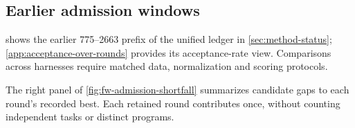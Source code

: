 \subsection{Earlier admission windows}\label{app:record-windows}

 shows the earlier 775--2663 prefix of the unified
ledger in \cref{sec:method-status}; \cref{app:acceptance-over-rounds}
provides its acceptance-rate view. Comparisons across harnesses require
matched data, normalization and scoring protocols.

The right panel of \cref{fig:fw-admission-shortfall} summarizes candidate
gaps to each round's recorded best. Each retained round contributes once,
without counting independent tasks or distinct programs.
